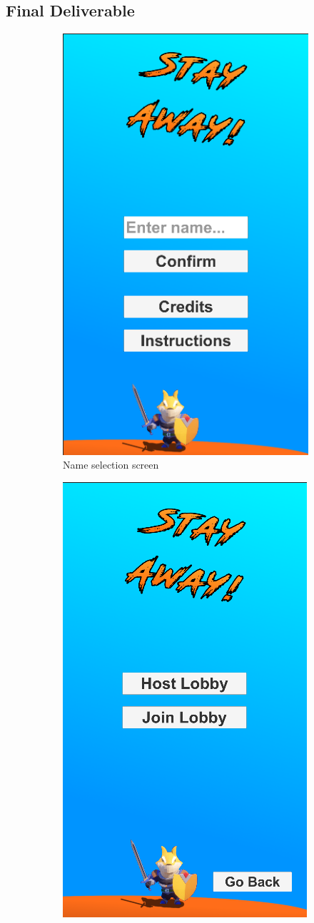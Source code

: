 \documentclass{dissertation}
\begin{document}
\begin{appendices}

\chapter{Final Deliverable}

\begin{figure}[H]
\begin{subfigure}[h]{.5\textwidth}
\centering
\includegraphics[width = .6\linewidth]{images/final-ui1.png}
\caption{Name selection screen}
\label{fig:f1}
\end{subfigure}
\begin{subfigure}[h]{.5\textwidth}
\centering
\includegraphics[width = .6\linewidth]{images/final-ui2.png}

\end{subfigure}
\end{figure}
\end{appendices}
\end{document}
